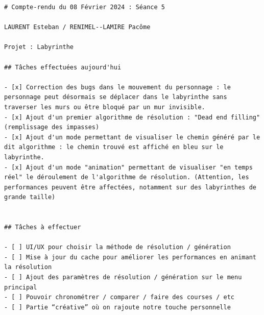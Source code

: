 \documentclass[12pt]{scrreprt} %
\begin{document}
\begin{verbatim}
# Compte-rendu du 08 Février 2024 : Séance 5

LAURENT Esteban / RENIMEL--LAMIRE Pacôme

Projet : Labyrinthe

## Tâches effectuées aujourd'hui

- [x] Correction des bugs dans le mouvement du personnage : le personnage peut désormais se déplacer dans le labyrinthe sans traverser les murs ou être bloqué par un mur invisible.
- [x] Ajout d'un premier algorithme de résolution : "Dead end filling" (remplissage des impasses)
- [x] Ajout d'un mode permettant de visualiser le chemin généré par le dit algorithme : le chemin trouvé est affiché en bleu sur le labyrinthe.
- [x] Ajout d'un mode "animation" permettant de visualiser "en temps réel" le déroulement de l'algorithme de résolution. (Attention, les performances peuvent être affectées, notamment sur des labyrinthes de grande taille)


## Tâches à effectuer

- [ ] UI/UX pour choisir la méthode de résolution / génération
- [ ] Mise à jour du cache pour améliorer les performances en animant la résolution
- [ ] Ajout des paramètres de résolution / génération sur le menu principal
- [ ] Pouvoir chronométrer / comparer / faire des courses / etc
- [ ] Partie “créative” où on rajoute notre touche personnelle

\end{verbatim}
\end{document}
